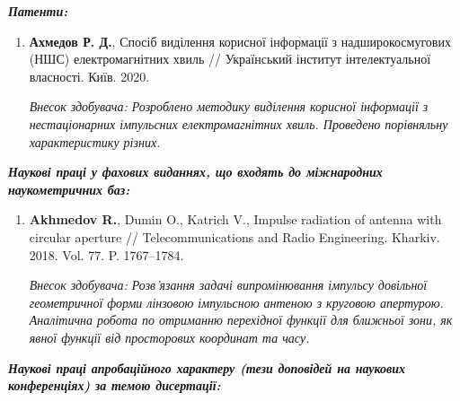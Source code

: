 \begin{center}
\textit{\textbf{Патенти:}}

\begin{enumerate}
\setcounter{enumi}{\value{ItemsInMyWriting}}

\item \textbf{Ахмедов Р. Д.}, Спосіб виділення корисної інформації з 
надширокосмугових (НШС) електромагнітних хвиль // Український інститут 
інтелектуальної власності. Київ. 2020.

\textit{Внесок здобувача: Розроблено методику виділення корисної інформації 
з нестаціонарних імпульсних електромагнітних хвиль. Проведено порівняльну 
характеристику різних.}

\setcounter{ItemsInMyWriting}{\value{enumi}}
\end{enumerate}

\begin{center} 
\textit{\textbf{Наукові праці у фахових виданнях, що входять до 
міжнародних наукометричних баз:}}
\end{center}

\begin{enumerate}
\setcounter{enumi}{\value{ItemsInMyWriting}}

\item \textbf{Akhmedov R.}, Dumin O., Katrich V., Impulse radiation of antenna 
with circular aperture // Telecommunications and Radio Engineering. Kharkiv. 
2018. Vol. 77. P. 1767--1784.

\textit{Внесок здобувача: Розв'язання задачі випромінювання імпульсу довільної
геометричної форми лінзовою імпульсною антеною з круговою апертурою. Аналітична
робота по отриманню перехідної функції для ближньої зони, як явної функції 
від просторових координат та часу.}

\setcounter{ItemsInMyWriting}{\value{enumi}}
\end{enumerate}


\begin{center} 
\textit{\textbf{Наукові праці апробаційного характеру (тези доповідей на 
наукових конференціях) за темою дисертації:}}
\end{center}

\begin{enumerate}
\setcounter{enumi}{\value{ItemsInMyWriting}}


\end{enumerate}
\end{center}
